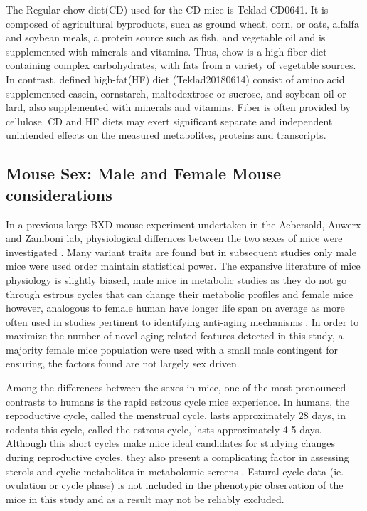 \documentclass[a4paper]{book}
\begin{document}
	The Regular chow diet(CD) used for the CD mice is Teklad CD0641. It is composed of agricultural byproducts, such as ground wheat, corn, or oats, alfalfa and soybean meals, a protein source such as fish, and vegetable oil and is supplemented with minerals and vitamins. Thus, chow is a high fiber diet containing complex carbohydrates, with fats from a variety of vegetable sources. In contrast, defined high-fat(HF) diet (Teklad20180614) consist of amino acid supplemented casein, cornstarch, maltodextrose or sucrose, and soybean oil or lard, also supplemented with minerals and vitamins. Fiber is often provided by cellulose. CD and HF diets may exert significant separate and independent unintended effects on the measured metabolites, proteins and transcripts.
	
	\subsection{Mouse Sex: Male and Female Mouse considerations}
	
	In a previous large BXD mouse experiment undertaken in the Aebersold, Auwerx and Zamboni lab, physiological differnces between the two sexes of mice were investigated \citep{Andreux2012SystemsTraits}. Many variant traits are found but in subsequent studies only male mice were used order maintain statistical power. The expansive literature of mice physiology is slightly biased, male mice in metabolic studies as they do not go through estrous cycles that can change their metabolic profiles\citep{Zucker2010MalesStudies} and female mice however, analogous to female human have longer life span on average as more often used in studies pertinent to identifying anti-aging mechanisms \citep{Yuan2011Miceaging}. In order to maximize the number of novel aging related features detected in this study, a majority female mice population were used with a small male contingent for ensuring, the factors found are not largely sex driven.
	
	Among the differences between the sexes in mice, one of the most pronounced contrasts to humans is the rapid estrous cycle mice experience. In humans, the reproductive cycle, called the menstrual cycle, lasts approximately 28 days, in rodents this cycle, called the estrous cycle, lasts approximately 4-5 days\citep{Nilsson2015MeasurementSpectrometry}. Although this short cycles make mice ideal candidates for studying changes during reproductive cycles, they also present a complicating factor in assessing sterols and cyclic metabolites in metabolomic screens \citep{Zucker2010MalesStudies}. Estural cycle data (ie. ovulation or cycle phase) is not included in the phenotypic observation of the mice in this study and as a result may not be reliably excluded. 
	
\end{document}
